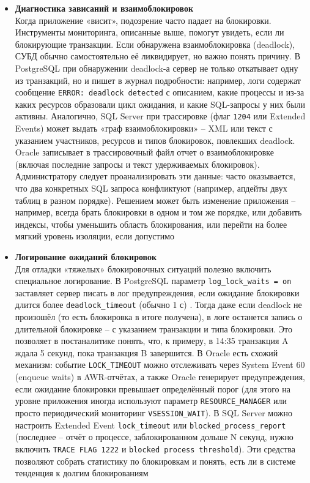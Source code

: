 \begin{itemize}
    \item \textbf{Диагностика зависаний и взаимоблокировок} ~\\
    Когда приложение «висит», подозрение часто падает на блокировки. Инструменты мониторинга, описанные выше, помогут увидеть, если ли блокирующие транзакции. Если обнаружена взаимоблокировка (deadlock), СУБД обычно самостоятельно её ликвидирует, но важно понять причину. В PostgreSQL при обнаружении deadlock-а сервер не только откатывает одну из транзакций, но и пишет в журнал подробности: например, логи содержат сообщение \texttt{ERROR: deadlock detected} с описанием, какие процессы и из-за каких ресурсов образовали цикл ожидания, и какие SQL-запросы у них были активны. Аналогично, SQL Server при трассировке (флаг \texttt{1204} или Extended Events) может выдать «граф взаимоблокировки» – XML или текст с указанием участников, ресурсов и типов блокировок, повлекших deadlock. Oracle записывает в трассировочный файл отчет о взаимоблокировке (включая последние запросы и текст удерживаемых блокировок). Администратору следует проанализировать эти данные: часто оказывается, что два конкретных SQL запроса конфликтуют (например, апдейты двух таблиц в разном порядке). Решением может быть изменение приложения – например, всегда брать блокировки в одном и том же порядке, или добавить индексы, чтобы уменьшить область блокирования, или перейти на более мягкий уровень изоляции, если допустимо
    \item \textbf{Логирование ожиданий блокировок} ~\\
    Для отладки «тяжелых» блокировочных ситуаций полезно включить специальное логирование. В PostgreSQL параметр \texttt{log\_lock\_waits = on} заставляет сервер писать в лог предупреждения, если ожидание блокировки длится более \texttt{deadlock\_timeout} (обычно 1 с) \autocite{PostgreSQLdocc19}. Тогда даже если deadlock не произошёл (то есть блокировка в итоге получена), в логе останется запись о длительной блокировке – с указанием транзакции и типа блокировки. Это позволяет в постаналитике понять, что, к примеру, в 14:35 транзакция A ждала 5 секунд, пока транзакция B завершится. В Oracle есть схожий механизм: событие \texttt{LOCK\_TIMEOUT} можно отслеживать через System Event 60 (enqueue waits) в AWR-отчётах, а также Oracle генерирует предупреждения, если ожидание блокировки превышает определённый порог (для этого на уровне приложения иногда используют параметр \texttt{RESOURCE\_MANAGER} или просто периодический мониторинг \texttt{V\textdollar SESSION\_WAIT}). В SQL Server можно настроить Extended Event \texttt{lock\_timeout} или \texttt{blocked\_process\_report} (последнее – отчёт о процессе, заблокированном дольше N секунд, нужно включить \texttt{TRACE FLAG 1222} и \texttt{blocked process threshold}). Эти средства позволяют собрать статистику по блокировкам и понять, есть ли в системе тенденция к долгим блокированиям 

\end{itemize}
